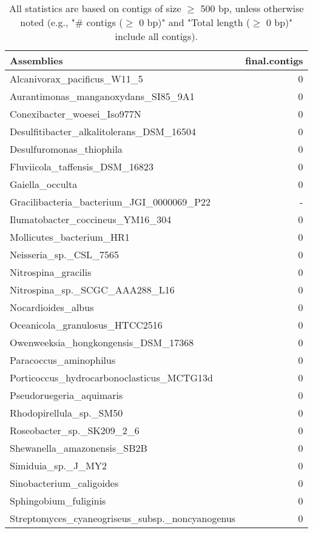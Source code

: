\documentclass[12pt,a4paper]{article}
\begin{document}
\begin{table}[ht]
\begin{center}
\caption{All statistics are based on contigs of size $\geq$ 500 bp, unless otherwise noted (e.g., "\# contigs ($\geq$ 0 bp)" and "Total length ($\geq$ 0 bp)" include all contigs).}
\begin{tabular}{|l*{1}{|r}|}
\hline
Assemblies & final.contigs \\ \hline
Alcanivorax\_pacificus\_W11\_5 & 0 \\ \hline
Aurantimonas\_manganoxydans\_SI85\_9A1 & 0 \\ \hline
Conexibacter\_woesei\_Iso977N & 0 \\ \hline
Desulfitibacter\_alkalitolerans\_DSM\_16504 & 0 \\ \hline
Desulfuromonas\_thiophila & 0 \\ \hline
Fluviicola\_taffensis\_DSM\_16823 & 0 \\ \hline
Gaiella\_occulta & 0 \\ \hline
Gracilibacteria\_bacterium\_JGI\_0000069\_P22 & - \\ \hline
Ilumatobacter\_coccineus\_YM16\_304 & 0 \\ \hline
Mollicutes\_bacterium\_HR1 & 0 \\ \hline
Neisseria\_sp.\_CSL\_7565 & 0 \\ \hline
Nitrospina\_gracilis & 0 \\ \hline
Nitrospina\_sp.\_SCGC\_AAA288\_L16 & 0 \\ \hline
Nocardioides\_albus & 0 \\ \hline
Oceanicola\_granulosus\_HTCC2516 & 0 \\ \hline
Owenweeksia\_hongkongensis\_DSM\_17368 & 0 \\ \hline
Paracoccus\_aminophilus & 0 \\ \hline
Porticoccus\_hydrocarbonoclasticus\_MCTG13d & 0 \\ \hline
Pseudoruegeria\_aquimaris & 0 \\ \hline
Rhodopirellula\_sp.\_SM50 & 0 \\ \hline
Roseobacter\_sp.\_SK209\_2\_6 & 0 \\ \hline
Shewanella\_amazonensis\_SB2B & 0 \\ \hline
Simiduia\_sp.\_J\_MY2 & 0 \\ \hline
Sinobacterium\_caligoides & 0 \\ \hline
Sphingobium\_fuliginis & 0 \\ \hline
Streptomyces\_cyaneogriseus\_subsp.\_noncyanogenus & 0 \\ \hline

\end{tabular}
\end{center}
\end{table}
\end{document}
